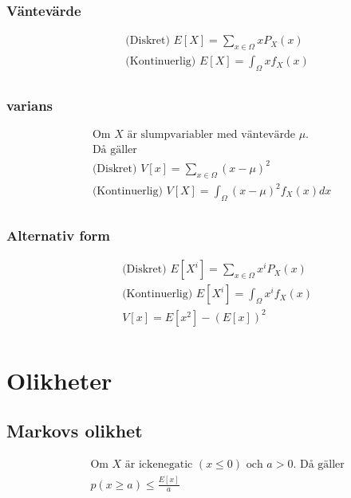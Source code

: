 \begin{multicols}{2}
\subsubsection{Väntevärde}
\begin{align*}
  &\quad  \text{(Diskret) }      E[X] = \sum_{x\in\Omega} x P_X(x) \\
  &\quad  \text{(Kontinuerlig) } E[X] = \int_{\Omega} x f_X(x) \\
\end{align*}

\subsubsection{varians}
\begin{align*}
  &\text{Om $X$ är slumpvariabler med väntevärde $\mu$.} \\
  &\text{Då gäller} \\
  &\text{(Diskret) }      V[x] = \sum_{x\in\Omega} (x-\mu)^2  \\
  &\text{(Kontinuerlig) } V[X] = \int_{\Omega} (x-\mu)^2 f_X(x)dx \\
\end{align*}

\subsubsection{Alternativ form}
\begin{align*}
  &\quad  \text{(Diskret) }      E[X^i] = \sum_{x\in\Omega} x^i P_X(x) \\
  &\quad  \text{(Kontinuerlig) } E[X^i] = \int_{\Omega} x^i f_X(x) \\
  &\quad  V[x]=E[x^2]-(E[x])^2 \\
\end{align*}

\section{Olikheter}
\subsection{Markovs olikhet}
\begin{align*}
  &\quad  \text{Om $X$ är ickenegatic $(x\leq{0})$ och $a>0$. Då gäller} \\
  &\quad  p(x\geq{a}) \leq \frac{E[x]}{a} \\
\end{align*}


\end{multicols}
